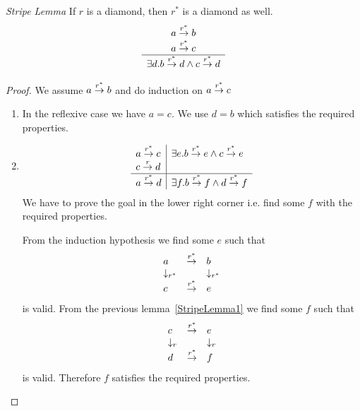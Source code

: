 \begin{lemma}
    \emph{Stripe Lemma} If $r$ is a diamond, then $r^*$ is a diamond as well.
    $$
    \begin{array}{c} 
        a \stackrel{r^*}{\to} b
        \\
        a \stackrel{r^*}{\to} c
     \\ \hline 
        \exists d. b \stackrel{r^*}{\to} d \land c \stackrel{r^*}{\to} d
    \end{array}
    $$

    \begin{proof}
        We assume $a \stackrel{r^*}{\to} b$ and do induction on $a \stackrel{r^*}{\to} c$

        \begin{enumerate}
        \item In the reflexive case we have $a = c$. We use $d = b$ which
        satisfies the required properties.

        \item
        $$
        \begin{array}{l|l}
            a \stackrel{r^*}{\to} c
            &
            \exists e. b \stackrel{r^*}{\to} e \land c \stackrel{r^*}{\to} e
            \\
            c \stackrel{r}{\to} d
            \\
            \hline
            a \stackrel{r^*}{\to} d
            &
            \exists f. b \stackrel{r^*}{\to} f \land d \stackrel{r^*}{\to} f
        \end{array}
        $$
        We have to prove the goal in the lower right corner i.e. find some $f$
        with the required properties.

        From the induction hypothesis we find some $e$ such that
        $$
        \begin{array}{lll}
            a &\stackrel{r^*}{\to}& b
            \\
            \downarrow_{r^*} & & \downarrow_{r^*}
            \\
            c &\stackrel{r^*}{\to}& e
        \end{array}
        $$
        is valid. From the previous lemma~\ref{StripeLemma1} we find some $f$
        such that
        $$
        \begin{array}{lll}
            c &\stackrel{r^*}{\to}& e
            \\
            \downarrow_{r} & & \downarrow_{r}
            \\
            d &\stackrel{r^*}{\to}& f
        \end{array}
        $$
        is valid. Therefore $f$ satisfies the required properties.
        \end{enumerate}
    \end{proof}
\end{lemma}








